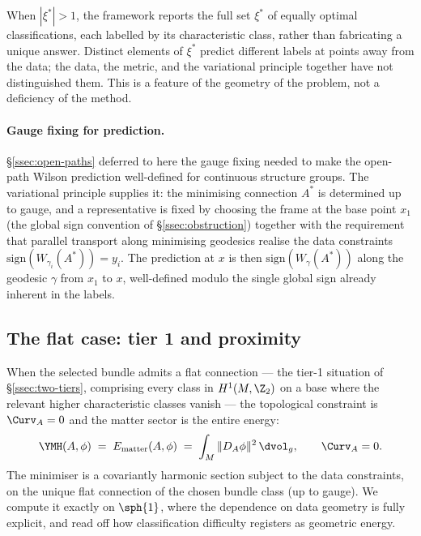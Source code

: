 \begin{remark}\label{rem:honest-degeneracy}
When $|\xi^*|>1$, the framework reports the full set $\xi^*$ of
equally optimal classifications, each labelled by its characteristic
class, rather than fabricating a unique answer. Distinct elements of
$\xi^*$ predict different labels at points away from the data; the
data, the metric, and the variational principle together have not
distinguished them. This is a feature of the geometry of the
problem, not a deficiency of the method.
\end{remark}

\paragraph{Gauge fixing for prediction.} \S\ref{ssec:open-paths}
deferred to here the gauge fixing needed to make the open-path Wilson
prediction well-defined for continuous structure groups. The
variational principle supplies it: the minimising connection $A^*$ is
determined up to gauge, and a representative is fixed by choosing the
frame at the base point $x_1$ (the global sign convention of
\S\ref{ssec:obstruction}) together with the requirement that
parallel transport along minimising geodesics realise the data
constraints $\mathrm{sign}(W_{\gamma_i}(A^*))=y_i$. The prediction at
$x$ is then $\mathrm{sign}(W_{\gamma}(A^*))$ along the geodesic
$\gamma$ from $x_1$ to $x$, well-defined modulo the single global
sign already inherent in the labels.

\subsection{The flat case: tier 1 and proximity}\label{ssec:ymh-flat}

When the selected bundle admits a flat connection --- the tier-1
situation of \S\ref{ssec:two-tiers}, comprising every class in
$H^1(M,\Z_2)$ on a base where the relevant higher characteristic
classes vanish --- the topological constraint is $\Curv_A=0$ and the
matter sector is the entire energy:
\[
   \YMH(A,\phi) \;=\; E_{\mathrm{matter}}(A,\phi)
   \;=\; \int_M \|D_A\phi\|^2\,\dvol_g,
   \qquad \Curv_A=0.
\]
The minimiser is a covariantly harmonic section subject to the data
constraints, on the unique flat connection of the chosen bundle
class (up to gauge). We compute it exactly on $\sph{1}$, where the
dependence on data geometry is fully explicit, and read off how
classification difficulty registers as geometric energy.

